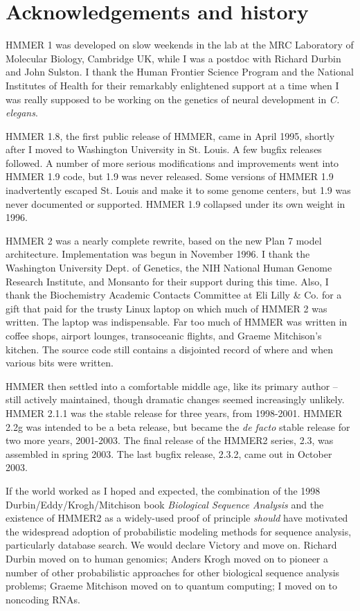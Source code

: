 \section{Acknowledgements and history}

HMMER 1 was developed on slow weekends in the lab at the MRC
Laboratory of Molecular Biology, Cambridge UK, while I was a postdoc
with Richard Durbin and John Sulston. I thank the Human Frontier
Science Program and the National Institutes of Health for their
remarkably enlightened support at a time when I was really supposed to
be working on the genetics of neural development in \emph{C. elegans}.

HMMER 1.8, the first public release of HMMER, came in April 1995,
shortly after I moved to Washington University in St. Louis. A few
bugfix releases followed. A number of more serious modifications and
improvements went into HMMER 1.9 code, but 1.9 was never
released. Some versions of HMMER 1.9 inadvertently escaped St. Louis
and make it to some genome centers, but 1.9 was never documented or
supported. HMMER 1.9 collapsed under its own weight in 1996.

HMMER 2 was a nearly complete rewrite, based on the new Plan 7 model
architecture. Implementation was begun in November 1996. I thank the
Washington University Dept. of Genetics, the NIH National Human Genome
Research Institute, and Monsanto for their support during this time.
Also, I thank the Biochemistry Academic Contacts Committee at Eli
Lilly \& Co. for a gift that paid for the trusty Linux laptop on which
much of HMMER 2 was written. The laptop was indispensable. Far too
much of HMMER was written in coffee shops, airport lounges,
transoceanic flights, and Graeme Mitchison's kitchen. The source code
still contains a disjointed record of where and when various bits were
written.

HMMER then settled into a comfortable middle age, like its primary
author -- still actively maintained, though dramatic changes seemed
increasingly unlikely. HMMER 2.1.1 was the stable release for three
years, from 1998-2001.  HMMER 2.2g was intended to be a beta release,
but became the \emph{de facto} stable release for two more years,
2001-2003. The final release of the HMMER2 series, 2.3, was assembled
in spring 2003.  The last bugfix release, 2.3.2, came out in October
2003.

If the world worked as I hoped and expected, the combination of the
1998 Durbin/Eddy/Krogh/Mitchison book \emph{Biological Sequence
  Analysis} and the existence of HMMER2 as a widely-used proof of
principle \emph{should} have motivated the widespread adoption of
probabilistic modeling methods for sequence analysis, particularly
database search. We would declare Victory and move on. Richard Durbin
moved on to human genomics; Anders Krogh moved on to pioneer a number
of other probabilistic approaches for other biological sequence
analysis problems; Graeme Mitchison moved on to quantum computing; I
moved on to noncoding RNAs.  


